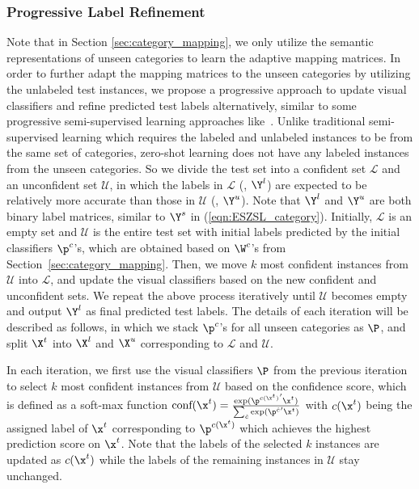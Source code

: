 \documentclass[journal]{IEEEtran}
\begin{document}
\subsubsection{Progressive Label Refinement} \label{sec:progressive_refinement}
Note that in Section \ref{sec:category_mapping}, we only utilize the semantic representations of  unseen categories to learn the adaptive mapping matrices. In order to further adapt the mapping matrices to the unseen categories by utilizing the unlabeled test instances, we propose a progressive approach to update visual classifiers and refine predicted test labels alternatively, similar to some progressive semi-supervised learning approaches like~\cite{blum1998combining}. Unlike traditional semi-supervised learning which requires the labeled and unlabeled instances to be from the same set of categories, zero-shot learning does not have any labeled instances from the unseen categories. So we divide the test set into a confident set $\mathcal{L}$ and an unconfident set $\mathcal{U}$, in which the labels in $\mathcal{L}$ (\ie, $\Y^l$) are expected to be relatively more accurate than those in $\mathcal{U}$ (\ie, $\Y^u$). Note that $\Y^l$ and $\Y^u$ are both binary label matrices, similar to $\Y^s$ in (\ref{eqn:ESZSL_category}). Initially, $\mathcal{L}$ is an empty set and $\mathcal{U}$ is the entire test set with initial labels predicted by the initial classifiers $\p^c$'s, which are obtained based on $\W^c$'s from Section~\ref{sec:category_mapping}. Then, we move $k$ most confident instances from $\mathcal{U}$ into $\mathcal{L}$, and update the visual classifiers based on the new confident and unconfident sets. We repeat the above process iteratively until $\mathcal{U}$ becomes empty and output $\Y^l$ as final predicted test labels. The details of each iteration will be described as follows, in which we stack $\p^c$'s for all unseen categories as $\P$, and split $\X^t$ into $\X^l$ and $\X^u$ corresponding to $\mathcal{L}$ and $\mathcal{U}$.

In each iteration, we first use the visual classifiers $\P$ from the previous iteration to select  $k$ most confident instances from $\mathcal{U}$ based on the confidence score, which is defined as a soft-max function $\textnormal{conf}(\x^t) = \frac{\exp({\p^{c(\x^t)}}'\x^t)}{\sum_{\hat{c}}\exp({\p^{\hat{c}}}'\x^t)}$ with $c(\x^t)$ being the assigned label of $\x^t$ corresponding to $\p^{c(\x^t)}$ which achieves the highest prediction score on $\x^t$. Note that the labels of the selected $k$ instances are updated as $c(\x^t)$ while the labels of the remaining instances in $\mathcal{U}$ stay unchanged.  
\end{document}
